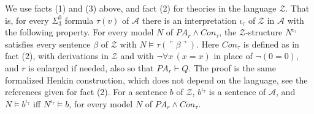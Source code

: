 \documentclass{amsart}  %
\numberwithin{equation}{section}
\theoremstyle{definition}
\theoremstyle{remark}
\begin{document}
We use facts (1) and (3) above, and fact (2) for theories in the language $\mathcal{Z}$. That is, for every $\Sigma ^{0} _{3}$ formula $\tau (v)$ of $\mathcal{A}$ there is an interpretation $\iota _{\tau}$ of $\mathcal{Z}$ in $\mathcal{A}$ with the following property. For every model $N$ of $PA _{r} \land Con _{\tau}$, the $\mathcal{Z}$-structure $N ^{\iota _{\tau}}$ satisfies every sentence $\beta$ of $\mathcal{Z}$ with $N \models \tau (\ulcorner \beta \urcorner)$. Here $Con _{\tau}$ is defined as in fact (2), with derivations in $\mathcal{Z}$ and with $\neg \forall x \, (x = x)$ in place of $\neg (0 = 0)$, and $r$ is enlarged if needed, also so that $PA _{r} \vdash Q$. The proof is the same formalized Henkin construction, which does not depend on the language, see the references given for fact (2). For a sentence $b$ of $\mathcal{Z}$, $b ^{\iota _{\tau}}$ is a sentence of $\mathcal{A}$, and $N \models b ^{\iota _{\tau}}$ iff $N ^{\iota _{\tau}} \models b$, for every model $N$ of $PA _{r} \land Con _{\tau}$.
\end{document}
